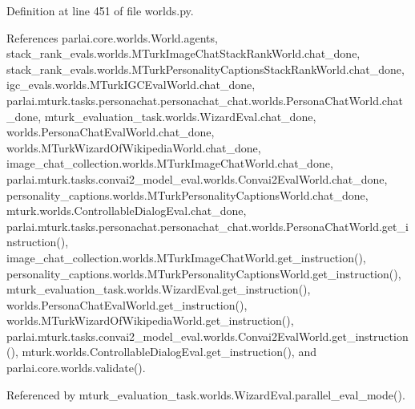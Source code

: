 Definition at line 451 of file worlds.\+py.



References parlai.\+core.\+worlds.\+World.\+agents, stack\+\_\+rank\+\_\+evals.\+worlds.\+M\+Turk\+Image\+Chat\+Stack\+Rank\+World.\+chat\+\_\+done, stack\+\_\+rank\+\_\+evals.\+worlds.\+M\+Turk\+Personality\+Captions\+Stack\+Rank\+World.\+chat\+\_\+done, igc\+\_\+evals.\+worlds.\+M\+Turk\+I\+G\+C\+Eval\+World.\+chat\+\_\+done, parlai.\+mturk.\+tasks.\+personachat.\+personachat\+\_\+chat.\+worlds.\+Persona\+Chat\+World.\+chat\+\_\+done, mturk\+\_\+evaluation\+\_\+task.\+worlds.\+Wizard\+Eval.\+chat\+\_\+done, worlds.\+Persona\+Chat\+Eval\+World.\+chat\+\_\+done, worlds.\+M\+Turk\+Wizard\+Of\+Wikipedia\+World.\+chat\+\_\+done, image\+\_\+chat\+\_\+collection.\+worlds.\+M\+Turk\+Image\+Chat\+World.\+chat\+\_\+done, parlai.\+mturk.\+tasks.\+convai2\+\_\+model\+\_\+eval.\+worlds.\+Convai2\+Eval\+World.\+chat\+\_\+done, personality\+\_\+captions.\+worlds.\+M\+Turk\+Personality\+Captions\+World.\+chat\+\_\+done, mturk.\+worlds.\+Controllable\+Dialog\+Eval.\+chat\+\_\+done, parlai.\+mturk.\+tasks.\+personachat.\+personachat\+\_\+chat.\+worlds.\+Persona\+Chat\+World.\+get\+\_\+instruction(), image\+\_\+chat\+\_\+collection.\+worlds.\+M\+Turk\+Image\+Chat\+World.\+get\+\_\+instruction(), personality\+\_\+captions.\+worlds.\+M\+Turk\+Personality\+Captions\+World.\+get\+\_\+instruction(), mturk\+\_\+evaluation\+\_\+task.\+worlds.\+Wizard\+Eval.\+get\+\_\+instruction(), worlds.\+Persona\+Chat\+Eval\+World.\+get\+\_\+instruction(), worlds.\+M\+Turk\+Wizard\+Of\+Wikipedia\+World.\+get\+\_\+instruction(), parlai.\+mturk.\+tasks.\+convai2\+\_\+model\+\_\+eval.\+worlds.\+Convai2\+Eval\+World.\+get\+\_\+instruction(), mturk.\+worlds.\+Controllable\+Dialog\+Eval.\+get\+\_\+instruction(), and parlai.\+core.\+worlds.\+validate().



Referenced by mturk\+\_\+evaluation\+\_\+task.\+worlds.\+Wizard\+Eval.\+parallel\+\_\+eval\+\_\+mode().

